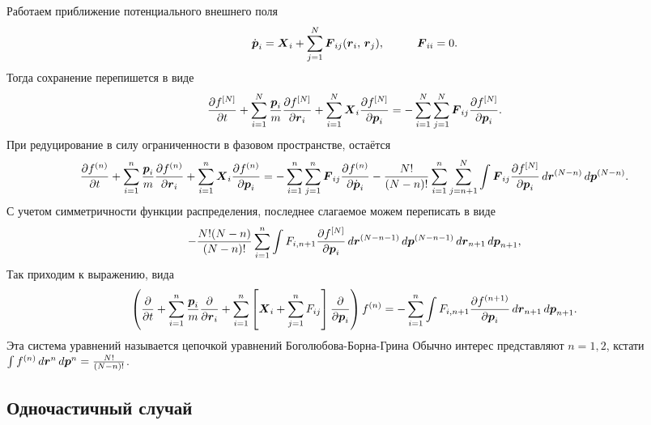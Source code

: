 Работаем  приближение потенциального внешнего поля
\begin{equation*}
	\dot{\vc{p}}_i = \vc{X}_i + \sum_{j=1}^{N} \vc{F}_{ij} (\vc{r}_i,\, \vc{r}_j),
	\hspace{10 mm} 
	\vc{F}_{ii} = 0.
\end{equation*}
Тогда сохранение перепишется в виде
\begin{equation*}
	\frac{\partial f^{[N]}}{\partial t} + \sum_{i=1}^{N} \frac{\boldsymbol{p}_i}{m} \frac{\partial f^{[N]}}{\partial \boldsymbol{r}_i} + \sum_{i=1}^{N} \boldsymbol{X}_i \frac{\partial f^{[N]}}{\partial \boldsymbol{p}_i} = -
	\sum_{i=1}^{N} \sum_{j=1}^{N} \boldsymbol{F}_{ij} \frac{\partial f^{[N]}}{\partial \boldsymbol{p}_i}.
\end{equation*}
При редуцирование в силу ограниченности в фазовом пространстве, остаётся
\begin{equation*}
	\frac{\partial f^{(n)}}{\partial t} + \sum_{i=1}^{n} \frac{\boldsymbol{p}_i}{m} \frac{\partial f^{(n)}}{\partial \boldsymbol{r}_i} + \sum_{i=1}^{n} \boldsymbol{X}_i \frac{\partial f^{(n)}}{\partial \boldsymbol{p}_i} = - \sum_{i=1}^{n} \sum_{j=1}^{n} \boldsymbol{F}_{ij} \frac{\partial f^{(n)}}{\partial \dot{\boldsymbol{p}}_i} - \frac{N!}{(N-n)!} \sum_{i=1}^{n} \sum_{j=n+1}^{N} \int \boldsymbol{F}_{ij} \frac{\partial f^{[N]}}{\partial \boldsymbol{p}_i} \, d \boldsymbol{r}^{(N-n)} \, d \boldsymbol{p}^{(N-n)}.
\end{equation*}
С учетом симметричности функции распределения, последнее слагаемое можем переписать в виде
\begin{equation*}
	- \frac{N! (N-n)}{(N-n)!} \sum_{i=1}^{n} \int F_{i, n+1} \frac{\partial f^{[N]}}{\partial \boldsymbol{p}_i} \, d \boldsymbol{r}^{(N-n-1)} \, d \boldsymbol{p}^{(N-n-1)} \, d \boldsymbol{r}_{n+1} \, d \boldsymbol{p}_{n+1},
\end{equation*}
Так приходим к выражению, вида
\begin{equation*}
	\left(
		\frac{\partial }{\partial t} + \sum_{i=1}^{n} \frac{\boldsymbol{p}_i}{m} \frac{\partial }{\partial \boldsymbol{r}_i} + \sum_{i=1}^{n} \left[
			\boldsymbol{X}_i + \sum_{j=1}^{n} F_{ij}
		\right] \frac{\partial }{\partial \boldsymbol{p}_i} 
	\right) f^{(n)} = - \sum_{i=1}^{n} \int F_{i, n+1} \frac{\partial f^{(n+1)}}{\partial \boldsymbol{p}_i} \, d \boldsymbol{r}_{n+1} \, d \boldsymbol{p}_{n+1}.
\end{equation*}
Эта система уравнений называется цепочкой уравнений Боголюбова-Борна-Грина 
Обычно интерес представляют $n = 1, 2$, кстати $\int f^{(n)} \, d \boldsymbol{r}^{n} \, d \boldsymbol{p}^n = \frac{N!}{(N-n)!}$.

\subsection*{Одночастичный случай}

